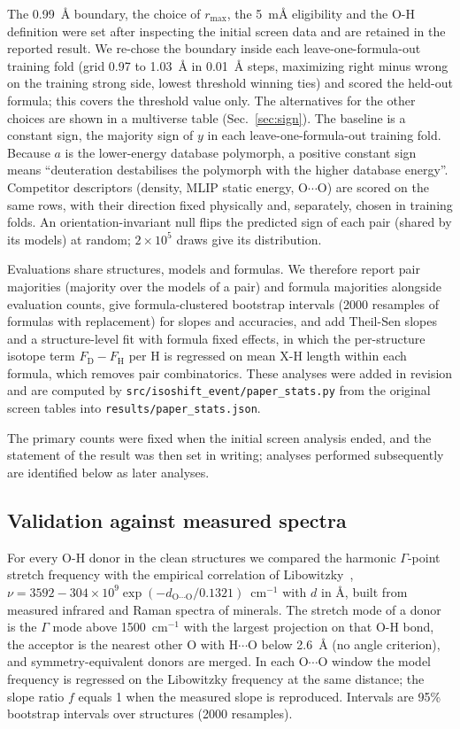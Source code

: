 \documentclass[aps,prmaterials,reprint,superscriptaddress,nofootinbib]{revtex4-2}
\begin{document}
The 0.99~\AA{} boundary, the choice of $r_{\max}$, the 5~m\AA{} eligibility and the O-H definition were set after inspecting the initial screen data and are retained in the reported result. We re-chose the boundary inside each leave-one-formula-out training fold (grid 0.97 to 1.03~\AA{} in 0.01~\AA{} steps, maximizing right minus wrong on the training strong side, lowest threshold winning ties) and scored the held-out formula; this covers the threshold value only. The alternatives for the other choices are shown in a multiverse table (Sec.~\ref{sec:sign}). The baseline is a constant sign, the majority sign of $y$ in each leave-one-formula-out training fold. Because $a$ is the lower-energy database polymorph, a positive constant sign means ``deuteration destabilises the polymorph with the higher database energy''. Competitor descriptors (density, MLIP static energy, O$\cdots$O) are scored on the same rows, with their direction fixed physically and, separately, chosen in training folds. An orientation-invariant null flips the predicted sign of each pair (shared by its models) at random; $2\times10^5$ draws give its distribution.

Evaluations share structures, models and formulas. We therefore report pair majorities (majority over the models of a pair) and formula majorities alongside evaluation counts, give formula-clustered bootstrap intervals (2000 resamples of formulas with replacement) for slopes and accuracies, and add Theil-Sen slopes and a structure-level fit with formula fixed effects, in which the per-structure isotope term $F_{\mathrm{D}} - F_{\mathrm{H}}$ per H is regressed on mean X-H length within each formula, which removes pair combinatorics. These analyses were added in revision and are computed by \texttt{src/isoshift\_event/paper\_stats.py} from the original screen tables into \texttt{results/paper\_stats.json}.

The primary counts were fixed when the initial screen analysis ended, and the statement of the result was then set in writing; analyses performed subsequently are identified below as later analyses.

\subsection{Validation against measured spectra}

For every O-H donor in the clean structures we compared the harmonic $\Gamma$-point stretch frequency with the empirical correlation of Libowitzky~\cite{Libowitzky1999}, $\nu = 3592 - 304\times10^{9}\exp(-d_{\mathrm{O\cdots O}}/0.1321)$~cm$^{-1}$ with $d$ in \AA, built from measured infrared and Raman spectra of minerals. The stretch mode of a donor is the $\Gamma$ mode above 1500~cm$^{-1}$ with the largest projection on that O-H bond, the acceptor is the nearest other O with H$\cdots$O below 2.6~\AA{} (no angle criterion), and symmetry-equivalent donors are merged. In each O$\cdots$O window the model frequency is regressed on the Libowitzky frequency at the same distance; the slope ratio $f$ equals 1 when the measured slope is reproduced. Intervals are 95\% bootstrap intervals over structures (2000 resamples).
\end{document}
